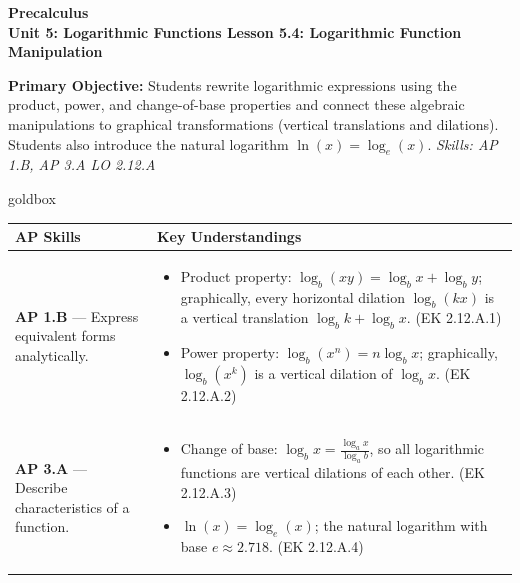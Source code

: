 \documentclass[10pt]{article}
\newcommand{\CourseName}{Precalculus}
\newcommand{\UnitNumberName}{Unit 5: Logarithmic Functions \quad}
\newcommand{\LessonNumberName}{Lesson 5.4: Logarithmic Function Manipulation}
\begin{document}
\begin{center}
    {\Large\bfseries \CourseName \\
    {\small\bfseries \UnitNumberName \LessonNumberName}}
\end{center}

\begin{tcolorbox}[colback=sky, colframe=navy, boxrule=0.9pt, arc=2mm,
    left=2mm, right=2mm, top=1.5mm, bottom=1.5mm]
    \textbf{Primary Objective:} Students rewrite logarithmic expressions using the product,
    power, and change-of-base properties and connect these algebraic manipulations to graphical
    transformations (vertical translations and dilations). Students also introduce the natural
    logarithm $\ln(x) = \log_e(x)$.
    \hfill\textit{\small Skills: AP 1.B, AP 3.A \quad LO 2.12.A}
\end{tcolorbox}

\renewcommand{\arraystretch}{1.6}
\begin{skillbox}{goldbox}
\begin{tabularx}{\linewidth}{@{}X X@{}}
\textbf{AP Skills} &
\textbf{Key Understandings} \\
\midrule
\textbf{AP 1.B} --- Express equivalent forms analytically. &
\begin{itemize}[leftmargin=1.2em,itemsep=2pt,topsep=0pt]
  \item Product property: $\log_b(xy) = \log_b x + \log_b y$; graphically, every
        horizontal dilation $\log_b(kx)$ is a vertical translation $\log_b k + \log_b x$.
        (EK 2.12.A.1)
  \item Power property: $\log_b(x^n) = n\log_b x$; graphically, $\log_b(x^k)$ is a
        vertical dilation of $\log_b x$. (EK 2.12.A.2)
\end{itemize} \\
\textbf{AP 3.A} --- Describe characteristics of a function. &
\begin{itemize}[leftmargin=1.2em,itemsep=2pt,topsep=0pt]
  \item Change of base: $\log_b x = \tfrac{\log_a x}{\log_a b}$, so all logarithmic
        functions are vertical dilations of each other. (EK 2.12.A.3)
  \item $\ln(x) = \log_e(x)$; the natural logarithm with base $e \approx 2.718$.
        (EK 2.12.A.4)
\end{itemize} \\
\end{tabularx}
\end{skillbox}
\end{document}
